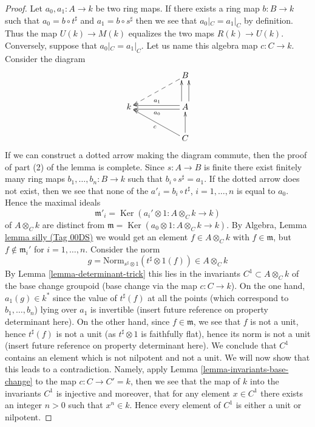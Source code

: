 \documentclass{amsart}
\theoremstyle{plain}
\theoremstyle{definition}
\theoremstyle{remark}
\numberwithin{equation}{subsection}
\def\Ker{\mathop{\mathrm{Ker}}}
\begin{document}
\begin{proof}
\medskip\noindent
Let $a_0, a_1 : A \to k$ be two ring maps. If there exists a ring map
$b : B \to k$ such that $a_0 = b \circ t^\sharp$ and $a_1 = b \circ s^\sharp$
then we see that $a_0|_C = a_1|_C$ by definition. Thus the map
$U(k) \to M(k)$ equalizes the two maps $R(k) \to U(k)$.
Conversely, suppose that $a_0|_C = a_1|_C$. Let us name this algebra
map $c : C \to k$. Consider the diagram
$$
\xymatrix{
& &
B \ar@{-->}[lld] \\
k & &
A
\ar@<0.5ex>[ll]^{a_0}
\ar@<-0.5ex>[ll]_{a_1}
\ar@<1ex>[u]
\ar@<-1ex>[u] \\
& &
C \ar[u] \ar[llu]^c
}
$$
If we can construct a dotted arrow making the diagram commute, then
the proof of part (2) of the lemma is complete. Since $s : A \to B$ is finite
there exist finitely many ring maps
$b_1, \ldots, b_n : B \to k$ such that $b_i \circ s^\sharp = a_1$.
If the dotted arrow does not exist, then we see that none of the
$a'_i = b_i \circ t^\sharp$, $i = 1, \ldots, n$ is equal to $a_0$.
Hence the maximal ideals
$$
\mathfrak m'_i = \Ker(a_i' \otimes 1 : A \otimes_C k \to k)
$$
of $A \otimes_C k$ are distinct from
$\mathfrak m = \Ker(a_0 \otimes 1 : A \otimes_C k \to k)$.
By Algebra, Lemma \href{https://stacks.math.columbia.edu/tag/00DS}{lemma silly (Tag 00DS)} we would get an element
$f \in A \otimes_C k$ with $f \in \mathfrak m$, but
$f \not \in \mathfrak m_i'$ for $i = 1, \ldots, n$.
Consider the norm
$$
g = \text{Norm}_{s^\sharp \otimes 1}(t^\sharp \otimes 1(f))
\in
A \otimes_C k
$$
By Lemma \ref{lemma-determinant-trick} this lies in the invariants
$C^1 \subset A \otimes_C k$ of the base change
groupoid (base change via the map $c : C \to k$). On the one hand,
$a_1(g) \in k^*$ since
the value of $t^\sharp(f)$ at all the points (which correspond to
$b_1, \ldots, b_n$) lying over $a_1$ is
invertible (insert future reference on property determinant here).
On the other hand, since $f \in \mathfrak m$, we see that
$f$ is not a unit, hence $t^\sharp(f)$ is not a unit
(as $t^\sharp \otimes 1$ is faithfully flat),
hence its norm is not a unit (insert future reference
on property determinant here). We conclude that $C^1$ contains
an element which is not nilpotent
and not a unit. We will now show that this leads to a contradiction.
Namely, apply Lemma \ref{lemma-invariants-base-change}
to the map $c : C \to C' = k$, then
we see that the map of $k$ into the invariants $C^1$ is injective
and moreover, that for any element $x \in C^1$ there exists an integer
$n > 0$ such that $x^n \in k$. Hence every element of $C^1$ is
either a unit or nilpotent.


\end{proof}
\end{document}
